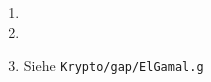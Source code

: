 \begin{enumerate}[label=\alph*)]
\item
\item
\item Siehe \texttt{Krypto/gap/ElGamal.g}
\end{enumerate}